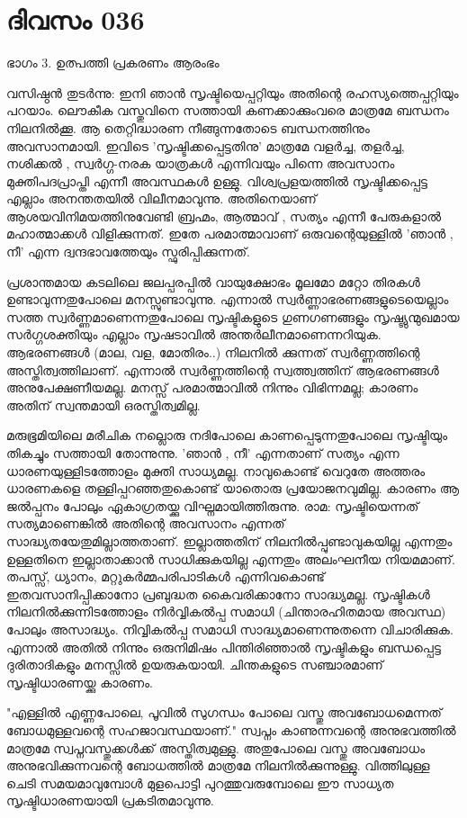  
\section{ദിവസം 036}

ഭാഗം 3. ഉത്പത്തി പ്രകരണം ആരംഭം 


വസിഷ്ഠന്‍ തുടര്‍ന്നു: ഇനി ഞാന്‍ സൃഷ്ടിയെപ്പറ്റിയും അതിന്റെ രഹസ്യത്തെപ്പറ്റിയും പറയാം. ലൌകീക വസ്തുവിനെ സത്തായി കണക്കാക്കുംവരെ മാത്രമേ ബന്ധനം നിലനില്‍ക്കൂ. ആ തെറ്റിദ്ധാരണ നീങ്ങുന്നതോടെ ബന്ധനത്തിനും അവസാനമായി. ഇവിടെ 'സൃഷ്ടിക്കപ്പെട്ടതിനു' മാത്രമേ വളര്‍ച്ച, തളര്‍ച്ച, നശിക്കല്‍ , സ്വര്‍ഗ്ഗ-നരക യാത്രകള്‍ എന്നിവയും പിന്നെ അവസാനം മുക്തിപദപ്രാപ്തി എന്നീ അവസ്ഥകള്‍ ഉള്ളു. വിശ്വപ്രളയത്തില്‍ സൃഷ്ടിക്കപ്പെട്ട എല്ലാം അനന്തതയില്‍ വിലീനമാവുന്നു. അതിനെയാണ്‌ ആശയവിനിമയത്തിനുവേണ്ടി ബ്രഹ്മം, ആത്മാവ്   , സത്യം എന്നീ പേരുകളാല്‍ മഹാത്മാക്കള്‍ വിളിക്കുന്നത്‌. ഇതേ പരമാത്മാവാണ്‌ ഒരുവന്റെയുള്ളില്‍ 'ഞാന്‍ , നീ' എന്ന ദ്വന്ദഭാവത്തേയും സ്ഫുരിപ്പിക്കുന്നത്‌. 

പ്രശാന്തമായ കടലിലെ ജലപ്പരപ്പില്‍ വായുക്ഷോഭം മൂലമോ മറ്റോ തിരകള്‍ ഉണ്ടാവുന്നതുപോലെ മനസ്സുണ്ടാവുന്നു. എന്നാല്‍ സ്വര്‍ണ്ണാഭരണങ്ങളുടെയെല്ലാം സത്ത സ്വര്‍ണ്ണമാണെന്നതുപോലെ സൃഷ്ടികളുടെ ഗുണഗണങ്ങളും സൃഷ്ട്യുന്മുഖമായ സര്‍ഗ്ഗശക്തിയും എല്ലാം സൃഷടാവില്‍ അന്തര്‍ലീനമാണെന്നറിയുക. ആഭരണങ്ങള്‍ (മാല, വള, മോതിരം..) നിലനില്‍ ക്കുന്നത്‌ സ്വര്‍ണ്ണത്തിന്റെ അസ്തിത്വത്തിലാണ്‌. എന്നാല്‍ സ്വര്‍ണ്ണത്തിന്റെ സ്വത്ത്വത്തിന്‌ ആഭരണങ്ങള്‍ അനുപേക്ഷണീയമല്ല. മനസ്സ്‌ പരമാത്മാവില്‍ നിന്നും വിഭിന്നമല്ല; കാരണം അതിന്‌ സ്വന്തമായി ഒരസ്തിത്വമില്ല. 

മരുഭൂമിയിലെ മരീചിക നല്ലൊരു നദിപോലെ കാണപ്പെടുന്നതുപോലെ സൃഷ്ടിയും തികച്ചും സത്തായി തോന്നുന്നു. 'ഞാന്‍ , നീ' എന്നതാണ്‌ സത്യം എന്ന ധാരണയുള്ളിടത്തോളം മുക്തി സാധ്യമല്ല. നാവുകൊണ്ട്‌ വെറുതേ അത്തരം ധാരണകളെ തള്ളിപ്പറഞ്ഞതുകൊണ്ട്‌ യാതൊരു പ്രയോജനവുമില്ല. കാരണം ആ ജല്‍പ്പനം പോലും ഏകാഗ്രതയ്ക്കു വിഘ്നമായിത്തിരുന്നു. രാമ: സൃഷ്ടിയെന്നത്‌ സത്യമാണെങ്കില്‍ അതിന്റെ അവസാനം എന്നത്‌ സാദ്ധ്യതയേതുമില്ലാത്തതാണ്‌. ഇല്ലാത്തതിന്‌ നിലനില്‍പ്പുണ്ടാവുകയില്ല എന്നതും ഉള്ളതിനെ ഇല്ലാതാക്കാന്‍ സാധിക്കുകയില്ല എന്നതും അലംഘനീയ നിയമമാണ്‌. തപസ്സ്‌, ധ്യാനം, മറ്റുകര്‍മ്മപരിപാടികള്‍ എന്നിവകൊണ്ട്‌ ഇതവസാനിപ്പിക്കാനോ പ്രബുദ്ധത കൈവരിക്കാനോ സാദ്ധ്യമല്ല. സൃഷ്ടികള്‍ നിലനില്‍ക്കുന്നിടത്തോളം നിര്‍വ്വികല്‍പ്പ സമാധി (ചിന്താരഹിതമായ അവസ്ഥ) പോലും അസാദ്ധ്യം. നിവ്വികല്‍പ്പ സമാധി സാദ്ധ്യമാണെന്നുതന്നെ വിചാരിക്കുക. എന്നാല്‍ അതില്‍ നിന്നും ഒരുനിമിഷം പിന്തിരിഞ്ഞാല്‍ സൃഷ്ടികളും ബന്ധപ്പെട്ട ദുരിതാദികളും മനസ്സില്‍ ഉയരുകയായി. ചിന്തകളുടെ സഞ്ചാരമാണ്‌ സൃഷ്ടിധാരണയ്ക്കു കാരണം. 

"എള്ളില്‍ എണ്ണപോലെ, പൂവില്‍ സുഗന്ധം പോലെ വസ്തു അവബോധമെന്നത്‌ ബോധമുള്ളവന്റെ സഹജാവസ്ഥയാണ്‌." സ്വപ്നം കാണുന്നവന്റെ അനുഭവത്തില്‍ മാത്രമേ സ്വപ്നവസ്തുക്കള്‍ക്ക്‌ അസ്തിത്വമുള്ളു. അതുപോലെ വസ്തു അവബോധം അനുഭവിക്കുന്നവന്റെ ബോധത്തില്‍ മാത്രമേ നിലനില്‍ക്കുന്നുള്ളു. വിത്തിലുള്ള ചെടി സമയമാവുമ്പോള്‍ മുളപൊട്ടി പുറത്തുവരുമ്പോലെ ഈ സാധ്യത സൃഷ്ടിധാരണയായി പ്രകടിതമാവുന്നു. 
